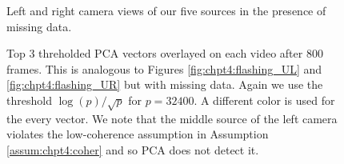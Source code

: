 \begin{figure}
  \begin{center}
    \caption{Left and right camera views of our five sources in the presence of missing
      data.}
    \label{fig:chpt4:flashing_miss}
  \end{center}
\end{figure}

\begin{figure}
  \begin{center}
    \caption{Top 3 threholded PCA vectors overlayed on each video after 800 frames. This
      is analogous to Figures \ref{fig:chpt4:flashing_UL} and \ref{fig:chpt4:flashing_UR}
      but with missing data. Again we use the threshold $\log(p)/\sqrt{p}$ for
      $p=32400$. A different color is used for the every vector. We note that the middle
      source of the left camera violates the low-coherence assumption in Assumption
      \ref{assum:chpt4:coher} and so PCA does not detect it.}
    \label{fig:chpt4:flashing_pca_miss}
  \end{center}
\end{figure}

